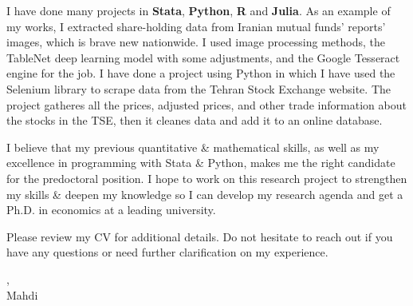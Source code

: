 \documentclass[12pt]{letter}
\begin{document}
\par

I have done many projects in \textbf{Stata}, \textbf{Python}, \textbf{R} and
\textbf{Julia}. As an example of my works, I extracted
share-holding data from Iranian mutual funds’ reports’ images, which is
brave new nationwide. I used image processing methods, the TableNet deep
learning model with some adjustments, and the Google Tesseract engine for the job.
I have done a project using Python in which I have used the Selenium library to scrape data from the
Tehran Stock Exchange website. The project gatheres all the prices, adjusted prices,
and other trade information about the stocks in the TSE, then it cleanes data
and add it to an online database.

\par

I believe that my previous quantitative \& mathematical skills,
as well as my excellence in programming with Stata \& Python,
makes me the right candidate for the predoctoral position.
I hope to work on this research project to strengthen
my skills \& deepen my knowledge so I can develop my research agenda and get
a Ph.D. in economics at a leading university.

Please review my CV for additional details. Do not hesitate to reach out if you have any questions or need further
clarification on my experience.

\vfill


\begin{flushleft}
    \closer,\\
    Mahdi
\end{flushleft}
\end{document}
